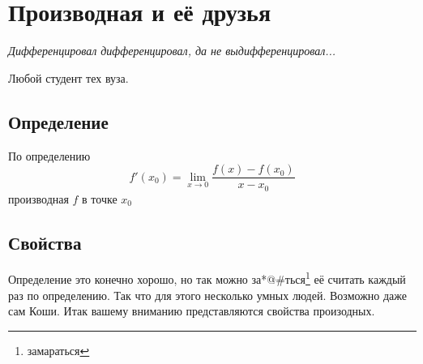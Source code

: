 \chapter{Производная {\scriptsize и её друзья}}
\epigraph{\textit{Дифференцировал дифференцировал, да не выдифференцировал...}}{Любой студент тех вуза.}
\section{Определение}
По определению
\begin{equation}
	f'(x_0) = \lim\limits_{x\rightarrow0}{\frac{f(x) - f(x_0)}{x - x_0}}
\end{equation}
производная $ f $ в точке $ x_0 $
\section{Свойства}
\label{DerTable}
Определение это конечно хорошо, но так можно за*@\#ться\footnote{замараться} её считать каждый раз по определению. Так что для этого несколько умных людей. Возможно даже сам Коши\cite{Koshi}. Итак вашему вниманию представляются свойства произодных.

